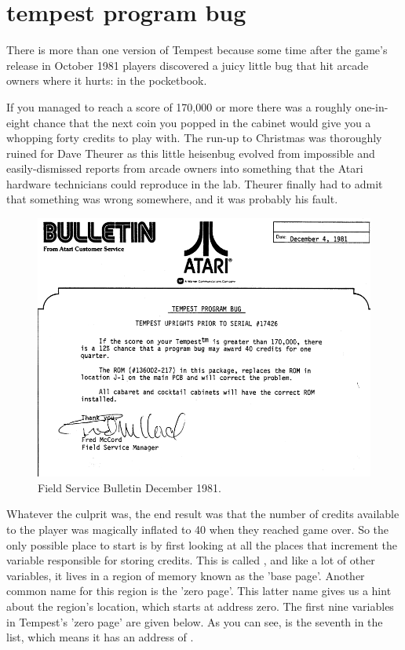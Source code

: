 \chapter{tempest program bug}
\label{sec:tempest_program_bug}
\lhead[tempest]{}
\lstset{style=6502Style}
There is more than one version of Tempest because some time after the game's
release in October 1981 players discovered a juicy little bug that hit arcade
owners where it hurts: in the pocketbook.

If you managed to reach a score of 170,000 or more there was a roughly one-in-eight chance that the next coin you
popped in the cabinet would give you a whopping forty credits to play with. The run-up
to Christmas was thoroughly ruined for Dave Theurer as this little heisenbug evolved
from impossible and easily-dismissed reports from arcade owners into something that the
Atari hardware technicians could reproduce in the lab. Theurer finally had to admit that
something was wrong somewhere, and it was probably his fault.



\begin{figure}[H]
    \centering
    \begin{adjustbox}{width=11cm,center}
      \includegraphics[width=12cm]{src/tempest_program_bug/bug.png}%
    \end{adjustbox}
  \caption{Field Service Bulletin December 1981.}
\end{figure}

Whatever the culprit was, the end result was that the number of credits available to the player was
magically inflated to 40 when they reached game over. So the only possible place to start is by first
looking at all the places that increment the variable responsible for storing credits. This is called
, and like a lot of other variables, it lives in a region of memory known as the 'base page'.
Another common name for this region is the 'zero page'. This latter name gives us a hint about the region's location,
which starts at address zero. The first nine variables in Tempest's 'zero page' are given below. As you can see,
 is the seventh in the list, which means it has an address of .

